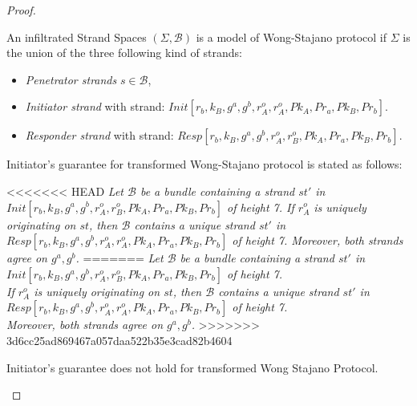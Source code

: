\begin{Definition}
\begin{table}[b]
\begin{proof}
\begin{Definition}
An infiltrated Strand Spaces $(\Sigma,\mathcal{B})$ is a model of Wong-Stajano protocol if $\Sigma$ is the union of the three following kind of strands:
\begin{itemize}
\item \emph{Penetrator strands} $s \in \mathcal{B}$,
\item \emph{Initiator strand} with strand: {\footnotesize $Init[r_b,k_B,g^a,g^b,r^o_A,r^o_A,Pk_A,Pr_a,Pk_B,Pr_b]$}.
\item \emph{Responder strand} with strand: {\footnotesize $Resp[r_b,k_B,g^a,g^b,r^o_A,r^o_B,Pk_A,Pr_a,Pk_B,Pr_b]$}.
\end{itemize}
\end{Definition}

Initiator's guarantee for transformed Wong-Stajano protocol is stated as follows:

<<<<<<< HEAD
\textit{Let $\mathcal{B}$ be a bundle containing a strand $st'$ in \\ {\footnotesize $Init[r_b,k_B,g^a,g^b,r^o_A,r^o_B,Pk_A,Pr_a,Pk_B,Pr_b]$} of height 7. If $r^o_A$ is uniquely originating on $st$, then $\mathcal{B}$ contains a unique strand $st'$ in\\ {\footnotesize $Resp[r_b,k_B,g^a,g^b,r^o_A,r^o_A,Pk_A,Pr_a,Pk_B,Pr_b]$} of height 7. Moreover, both strands agree on $g^a,g^b$.}
=======
\textit{Let $\mathcal{B}$ be a bundle containing a strand $st'$ in \\ {\footnotesize $Init[r_b,k_B,g^a,g^b,r^o_A,r^o_B,Pk_A,Pr_a,Pk_B,Pr_b]$} of height 7. \\ If $r^o_A$ is uniquely originating on $st$, then $\mathcal{B}$ contains a unique strand $st'$ in\\ {\footnotesize $Resp[r_b,k_B,g^a,g^b,r^o_A,r^o_A,Pk_A,Pr_a,Pk_B,Pr_b]$} of height 7. \\ Moreover, both strands agree on $g^a,g^b$.}
>>>>>>> 3d6cc25ad869467a057daa522b35e3cad82b4604

\begin{Proposition}
Initiator's guarantee does not hold for transformed Wong Stajano Protocol. 
\end{Proposition}


\end{proof}
\end{table}
\end{Definition}

